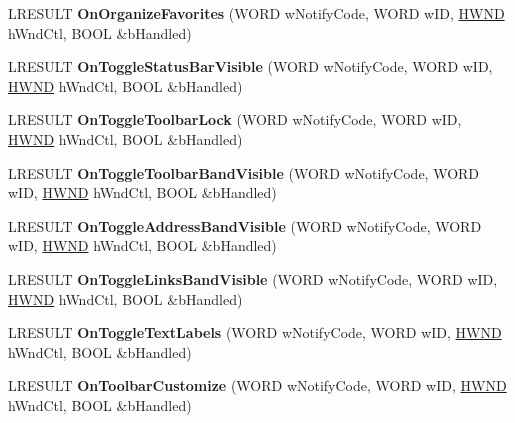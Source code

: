 \begin{DoxyCompactItemize}
L\+R\+E\+S\+U\+LT {\bfseries On\+Organize\+Favorites} (W\+O\+RD w\+Notify\+Code, W\+O\+RD w\+ID, \hyperlink{interfacevoid}{H\+W\+ND} h\+Wnd\+Ctl, B\+O\+OL \&b\+Handled)
\item 
\mbox{\label{class_c_shell_browser_a14e7cf8c62db1a85d09aee429464b768}} 
L\+R\+E\+S\+U\+LT {\bfseries On\+Toggle\+Status\+Bar\+Visible} (W\+O\+RD w\+Notify\+Code, W\+O\+RD w\+ID, \hyperlink{interfacevoid}{H\+W\+ND} h\+Wnd\+Ctl, B\+O\+OL \&b\+Handled)
\item 
\mbox{\label{class_c_shell_browser_a66a0c10c90c20a57152f5cdf8302b74a}} 
L\+R\+E\+S\+U\+LT {\bfseries On\+Toggle\+Toolbar\+Lock} (W\+O\+RD w\+Notify\+Code, W\+O\+RD w\+ID, \hyperlink{interfacevoid}{H\+W\+ND} h\+Wnd\+Ctl, B\+O\+OL \&b\+Handled)
\item 
\mbox{\label{class_c_shell_browser_a1d955003846b0298441a5ab552ed2616}} 
L\+R\+E\+S\+U\+LT {\bfseries On\+Toggle\+Toolbar\+Band\+Visible} (W\+O\+RD w\+Notify\+Code, W\+O\+RD w\+ID, \hyperlink{interfacevoid}{H\+W\+ND} h\+Wnd\+Ctl, B\+O\+OL \&b\+Handled)
\item 
\mbox{\label{class_c_shell_browser_a50464fde5a9cd40951ab081c9e9c2a19}} 
L\+R\+E\+S\+U\+LT {\bfseries On\+Toggle\+Address\+Band\+Visible} (W\+O\+RD w\+Notify\+Code, W\+O\+RD w\+ID, \hyperlink{interfacevoid}{H\+W\+ND} h\+Wnd\+Ctl, B\+O\+OL \&b\+Handled)
\item 
\mbox{\label{class_c_shell_browser_a50754e2e2712ac419fa415439674cd93}} 
L\+R\+E\+S\+U\+LT {\bfseries On\+Toggle\+Links\+Band\+Visible} (W\+O\+RD w\+Notify\+Code, W\+O\+RD w\+ID, \hyperlink{interfacevoid}{H\+W\+ND} h\+Wnd\+Ctl, B\+O\+OL \&b\+Handled)
\item 
\mbox{\label{class_c_shell_browser_a4648c698a91e42b61b84b78991f757d0}} 
L\+R\+E\+S\+U\+LT {\bfseries On\+Toggle\+Text\+Labels} (W\+O\+RD w\+Notify\+Code, W\+O\+RD w\+ID, \hyperlink{interfacevoid}{H\+W\+ND} h\+Wnd\+Ctl, B\+O\+OL \&b\+Handled)
\item 
\mbox{\label{class_c_shell_browser_a502356c72cefcc67e9d3d26cd2399426}} 
L\+R\+E\+S\+U\+LT {\bfseries On\+Toolbar\+Customize} (W\+O\+RD w\+Notify\+Code, W\+O\+RD w\+ID, \hyperlink{interfacevoid}{H\+W\+ND} h\+Wnd\+Ctl, B\+O\+OL \&b\+Handled)

\end{DoxyCompactItemize}
